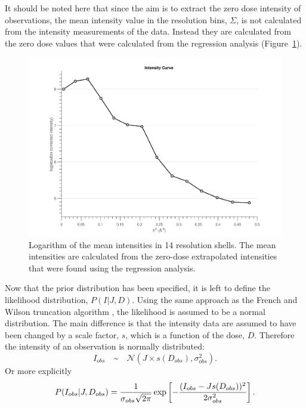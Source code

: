 It should be noted here that since the aim is to extract the zero dose intensity of observations, the mean intensity value in the resolution bins, $\Sigma$, is not calculated from the intensity measurements of the data.
Instead they are calculated from the zero dose values that were calculated from the regression analysis (Figure~\ref{fig:Zero-dose mean intensity in resolution shells - Extrapolation method}).
\begin{figure}
  \centering
    \includegraphics[width=1\textwidth]{figures/zde/extrapolationscaling.pdf}
    \caption[Logarithm of the zero-dose mean intensities in 14 resolution shells.]{Logarithm of the mean intensities in 14 resolution shells.
    The mean intensities are calculated from the zero-dose extrapolated intensities that were found using the regression analysis.}
    \label{fig:Zero-dose mean intensity in resolution shells - Extrapolation method}
\end{figure}

Now that the prior distribution has been specified, it is left to define the likelihood distribution, $P(I | J, D)$.
Using the same approach as the French and Wilson truncation algorithm \cite{french1978treatment}, the likelihood is assumed to be a normal distribution.
The main difference is that the intensity data are assumed to have been changed by a scale factor, $s$, which is a function of the dose, $D$.
Therefore the intensity of an observation is normally distributed:
\begin{equation}
    I_{obs} \quad \text{\textasciitilde} \quad \mathcal{N}(J \times s(D_{obs}),\sigma_{obs}^2).
    \label{eq:Normally distributed intensity - Extrapolation method}
\end{equation}
Or more explicitly
\begin{equation}
    P(I_{obs} | J, D_{obs}) = \frac{1}{\sigma_{obs} \sqrt{2\pi}} \exp \left[-\frac{(I_{obs} - J s(D_{obs}))^2}{2 \sigma^2_{obs}} \right].
    \label{eq:Normally distributed intensity full equation - Extrapolation method}
\end{equation}

